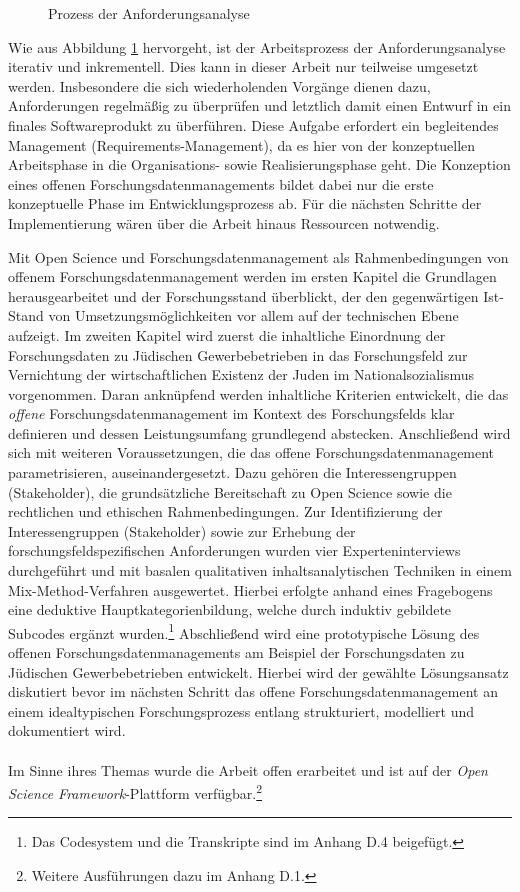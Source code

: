 \begin{figure}[h]
    \centering
    \caption{Prozess der Anforderungsanalyse}
    \label{fig:anforderungsanalyse}
\end{figure}

Wie aus Abbildung \ref{fig:anforderungsanalyse} hervorgeht, ist der Arbeitsprozess der Anforderungsanalyse iterativ und inkrementell. Dies kann in dieser Arbeit nur teilweise umgesetzt werden. Insbesondere die sich wiederholenden Vorgänge dienen dazu, Anforderungen regelmäßig zu überprüfen und letztlich damit einen Entwurf in ein finales Softwareprodukt zu überführen. Diese Aufgabe erfordert ein begleitendes Management (Requirements-Management), da es hier von der konzeptuellen Arbeitsphase in die Organisations- sowie Realisierungsphase geht. Die Konzeption eines offenen Forschungsdatenmanagements bildet dabei nur die erste konzeptuelle Phase im Entwicklungsprozess ab. Für die nächsten Schritte der Implementierung wären über die Arbeit hinaus Ressourcen notwendig.  

Mit Open Science und Forschungsdatenmanagement als Rahmenbedingungen von offenem Forschungsdatenmanagement werden im ersten Kapitel die Grundlagen herausgearbeitet und der Forschungsstand überblickt, der den gegenwärtigen Ist-Stand von Umsetzungsmöglichkeiten vor allem auf der technischen Ebene aufzeigt. Im zweiten Kapitel wird zuerst die inhaltliche Einordnung der Forschungsdaten zu Jüdischen Gewerbebetrieben in das Forschungsfeld zur Vernichtung der wirtschaftlichen Existenz der Juden im Nationalsozialismus vorgenommen. Daran anknüpfend werden inhaltliche Kriterien entwickelt, die das \textit{offene} Forschungsdatenmanagement im Kontext des Forschungsfelds klar definieren und dessen Leistungsumfang grundlegend abstecken. Anschließend wird sich mit weiteren Voraussetzungen, die das offene Forschungsdatenmanagement parametrisieren, auseinandergesetzt. Dazu gehören die Interessengruppen (Stakeholder), die grundsätzliche Bereitschaft zu Open Science sowie die rechtlichen und ethischen Rahmenbedingungen. Zur Identifizierung der Interessengruppen (Stakeholder) sowie zur Erhebung der forschungsfeldspezifischen Anforderungen wurden vier Experteninterviews durchgeführt und mit basalen qualitativen inhaltsanalytischen Techniken in einem Mix-Method-Verfahren ausgewertet. Hierbei erfolgte anhand eines Fragebogens eine deduktive Hauptkategorienbildung, welche durch induktiv gebildete Subcodes ergänzt wurden.\footnote{Das Codesystem und die Transkripte sind im Anhang D.4 beigefügt.} Abschließend wird eine prototypische Lösung des offenen Forschungsdatenmanagements am Beispiel der Forschungsdaten zu Jüdischen Gewerbebetrieben entwickelt. Hierbei wird der gewählte Lösungsansatz diskutiert bevor im nächsten Schritt das offene Forschungsdatenmanagement an einem idealtypischen Forschungsprozess entlang strukturiert, modelliert und dokumentiert wird.\\ \\
Im Sinne ihres Themas wurde die Arbeit offen erarbeitet und ist auf der \textit{Open Science Framework}-Plattform verfügbar.\footnote{Weitere Ausführungen dazu im Anhang D.1.}

